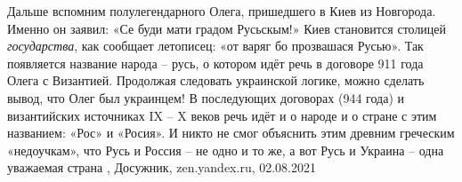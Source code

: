 Дальше вспомним полулегендарного Олега, пришедшего в Киев из Новгорода. Именно
он заявил: «Се буди мати градом Русьскым!» Киев становится столицей
\emph{государства}, как сообщает летописец: «от варяг бо прозвашася Русью». Так
появляется название народа – русь, о котором идёт речь в договоре 911 года
Олега с Византией. Продолжая следовать украинской логике, можно сделать вывод,
что Олег был украинцем!  В последующих договорах (944 года) и византийских
источниках IX – X веков речь идёт и о народе и о стране с этим названием: «Рос»
и «Росия». И никто не смог объяснить этим древним греческим «недоучкам», что
Русь и Россия – не одно и то же, а вот Русь и Украина – одна уважаемая страна
, Досужник, zen.yandex.ru, 02.08.2021

